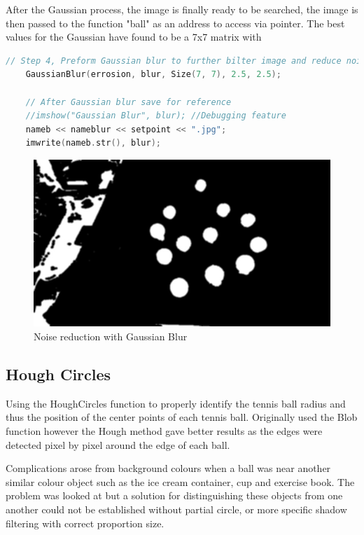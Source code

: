 \documentclass[a4paper, 10pt]{article}
\begin{document}
After the Gaussian process, the image is finally ready to be searched, the image is then passed to the function "ball" as an address to access via pointer. The best values for the Gaussian have found to be a 7x7 matrix with 

\begin{lstlisting}[language = C++]
	// Step 4, Preform Gaussian blur to further bilter image and reduce noise to better detect the raound point for the circles
	GaussianBlur(errosion, blur, Size(7, 7), 2.5, 2.5);

	// After Gaussian blur save for reference
	//imshow("Gaussian Blur", blur); //Debugging feature
	nameb << nameblur << setpoint << ".jpg";
	imwrite(nameb.str(), blur);		
\end{lstlisting}

\begin{figure}[H]
  \includegraphics[width=\linewidth]{images/Blur}
  \caption{Noise reduction with Gaussian Blur}
  \label{fig:Noise reduction with Gaussian Blur}
\end{figure}

\clearpage
\subsection{Hough Circles}

Using the HoughCircles function to properly identify the tennis ball radius and thus the position of the center points of each tennis ball. Originally used the Blob function however the Hough method gave better results as the edges were detected pixel by pixel around the edge of each ball. 

Complications arose from background colours when a ball was near another similar colour object such as the ice cream container, cup and exercise book. The problem was looked at but a solution for distinguishing these objects from one another could not be established without partial circle, or more specific shadow filtering with correct proportion size.
\end{document}
